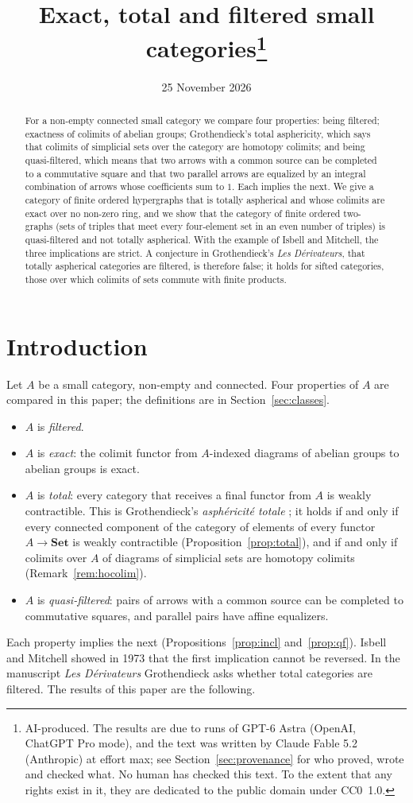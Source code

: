 \documentclass[11pt,a4paper]{article}
\title{Exact, total and filtered small categories\thanks{AI-produced. The
results are due to runs of GPT-6 Astra (OpenAI, ChatGPT Pro mode), and the text
was written by Claude Fable 5.2 (Anthropic) at effort max; see
Section~\ref{sec:provenance} for who proved, wrote and checked what. No
human has checked this text. To the extent that any rights exist in it, they
are dedicated to the public domain under CC0~1.0.}}
\author{}
\date{25 November 2026}
\theoremstyle{definition}
\newcommand{\Set}{\mathbf{Set}}
\begin{document}
\maketitle

\begin{abstract}
For a non-empty connected small category we compare four properties: being
filtered; exactness of colimits of abelian groups; Grothendieck's total
asphericity, which says that colimits of simplicial sets over the category
are homotopy colimits; and being quasi-filtered, which means that two arrows
with a common source can be completed to a commutative square and that two
parallel arrows are equalized by an integral combination of arrows whose
coefficients sum to $1$. Each implies the next. We give a category of finite
ordered hypergraphs that is totally aspherical and whose colimits are exact
over no non-zero ring, and we show that the category of finite ordered
two-graphs (sets of triples that meet every four-element set in an even
number of triples) is quasi-filtered and not totally aspherical. With the
example of Isbell and Mitchell, the three implications are strict. A
conjecture in Grothendieck's \emph{Les D\'erivateurs}, that totally
aspherical categories are filtered, is therefore false; it holds for sifted
categories, those over which colimits of sets commute with finite products.
\end{abstract}

\section{Introduction}

Let $A$ be a small category, non-empty and connected. Four properties of $A$
are compared in this paper; the definitions are in
Section~\ref{sec:classes}.
\begin{itemize}
\item $A$ is \emph{filtered}.
\item $A$ is \emph{exact}: the colimit functor from $A$-indexed diagrams of
 abelian groups to abelian groups is exact.
\item $A$ is \emph{total}: every category that receives a final functor from
 $A$ is weakly contractible. This is Grothendieck's \emph{asph\'ericit\'e
 totale} \cite{Der}; it holds if and only if every connected component of the
 category of elements of every functor $A\to\Set$ is weakly contractible
 (Proposition~\ref{prop:total}), and if and only if colimits over $A$ of
 diagrams of simplicial sets are homotopy colimits (Remark~\ref{rem:hocolim}).
\item $A$ is \emph{quasi-filtered}: pairs of arrows with a common source can be
 completed to commutative squares, and parallel pairs have affine equalizers.
\end{itemize}
Each property implies the next (Propositions~\ref{prop:incl}
and~\ref{prop:qf}). Isbell and Mitchell showed in 1973 that the first
implication cannot be reversed. In the manuscript \emph{Les D\'erivateurs}
Grothendieck asks whether total categories are filtered. The results of this
paper are the following.
\end{document}
